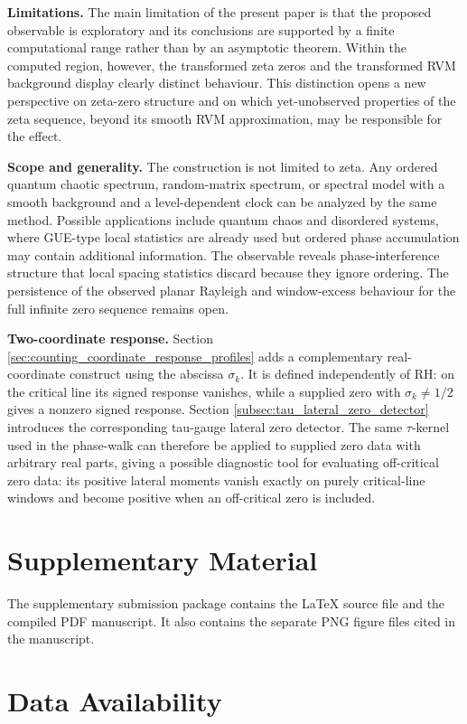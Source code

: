 \documentclass[12pt]{article}
\numberwithin{equation}{section}
\begin{document}
\textbf{Limitations.} The main limitation of the present paper is that the proposed observable is exploratory and its conclusions are supported by a finite computational range rather than by an asymptotic theorem.  Within the computed region, however, the transformed zeta zeros and the transformed RVM background display clearly distinct behaviour.  This distinction opens a new perspective on zeta-zero structure and on which yet-unobserved properties of the zeta sequence, beyond its smooth RVM approximation, may be responsible for the effect.

\textbf{Scope and generality.} The construction is not limited to zeta. Any ordered quantum chaotic spectrum, random-matrix spectrum, or spectral model with a smooth background and a level-dependent clock can be analyzed by the same method.  Possible applications include quantum chaos and disordered systems, where GUE-type local statistics are already used but ordered phase accumulation may contain additional information. The observable reveals phase-interference structure that local spacing statistics discard because they ignore ordering. The persistence of the observed planar Rayleigh and window-excess behaviour for the full infinite zero sequence remains open.

\textbf{Two-coordinate response.} Section \ref{sec:counting_coordinate_response_profiles} adds a complementary real-coordinate construct using the abscissa $\sigma_k$. It is defined independently of RH: on the critical line its signed response vanishes, while a supplied zero with $\sigma_k\neq1/2$ gives a nonzero signed response. Section \ref{subsec:tau_lateral_zero_detector} introduces the corresponding tau-gauge lateral zero detector. The same \(\tau\)-kernel used in the phase-walk can therefore be applied to supplied zero data with arbitrary real parts, giving a possible diagnostic tool for evaluating off-critical zero data: its positive lateral moments vanish exactly on purely critical-line windows and become positive when an off-critical zero is included.


\section*{Supplementary Material}

The supplementary submission package contains the LaTeX source file and the compiled PDF manuscript. It also contains the separate PNG figure files cited in the manuscript.

\section*{Data Availability}
\label{sec:data_availability}
\end{document}
